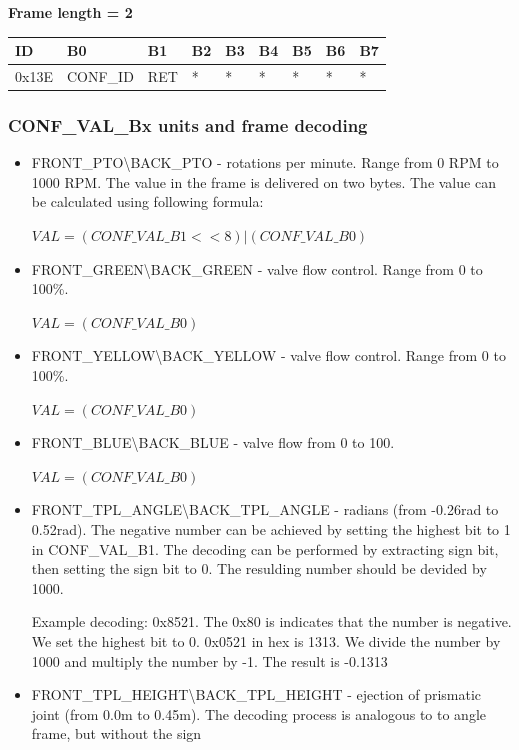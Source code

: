 \documentclass{article}
\begin{document}
\textbf{Frame length = 2}
\begin{center}
    \begin{tabular}{| p{30pt} | p{45pt} | p{70pt} | p{70pt} | p{40pt} | p{40pt} | p{40pt} | p{40pt} | p{40pt} |}
        \hline
        ID    & B0       & B1  & B2 & B3 & B4 & B5 & B6 & B7 \\
        \hline
        0x13E & CONF\_ID & RET & *  & *  & *  & *  & *  & *  \\
        \hline
    \end{tabular}
\end{center}



\subsubsection{CONF\_VAL\_Bx units and frame decoding}
\begin{itemize}
    \item FRONT\_PTO\textbackslash BACK\_PTO - rotations per minute. Range from 0 RPM to 1000 RPM. The value in the frame is delivered on two bytes. The value can be calculated using following formula:

          $VAL = (CONF\_VAL\_B1<<8) | (CONF\_VAL\_B0)$
    \item FRONT\_GREEN\textbackslash BACK\_GREEN - valve flow control. Range from 0 to 100\%.

          $VAL = (CONF\_VAL\_B0)$
    \item FRONT\_YELLOW\textbackslash BACK\_YELLOW - valve flow control. Range from 0 to 100\%.

          $VAL = (CONF\_VAL\_B0)$
    \item FRONT\_BLUE\textbackslash BACK\_BLUE - valve flow from 0 to 100.

          $VAL = (CONF\_VAL\_B0)$
    \item FRONT\_TPL\_ANGLE\textbackslash BACK\_TPL\_ANGLE - radians (from -0.26rad to 0.52rad). The negative number can be achieved by setting the highest bit to 1 in CONF\_VAL\_B1. The decoding can be performed by extracting sign bit, then setting the sign bit to 0. The resulding number should be devided by 1000.

          Example decoding: 0x8521. The 0x80 is indicates that the number is negative. We set the highest bit to 0. 0x0521 in hex is 1313. We divide the number by 1000 and multiply the number by -1. The result is -0.1313
    \item FRONT\_TPL\_HEIGHT\textbackslash BACK\_TPL\_HEIGHT - ejection of prismatic joint (from 0.0m to 0.45m). The decoding process is analogous to to angle frame, but without the sign
\end{itemize}
\end{document}
